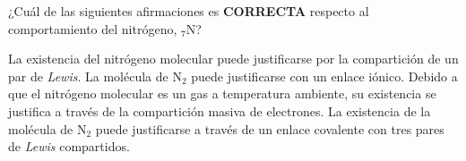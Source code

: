 \documentclass[answers,addpoints,14pt]{exam}
\newcommand*\chem[1]{\ensuremath{\mathrm{#1}}}
\newcommand{\halmos}{\vspace*{-4mm}
	
					\begin{flushright}
						\rule{1mm}{2.5mm} 
					\end{flushright}\vspace*{-4mm}
						
					  }
\renewcommand{\qed}{\halmos}
\begin{document}
\begin{questions}
	
		
%
%	
%	

	
	\begin{question}[1] ¿Cuál de las siguientes afirmaciones es \textbf{\small{CORRECTA}} respecto al comportamiento del nitrógeno, $_{7}\chem{N}$?
		\begin{checkboxes}
			\choice La existencia del nitrógeno molecular puede justificarse por la compartición de un par de \textit{Lewis}.
			\choice La molécula de $\chem{N_2}$ puede justificarse con un enlace iónico.
			\choice Debido a que el nitrógeno molecular es un gas a temperatura ambiente, su existencia se justifica a través de la compartición masiva de electrones.
			\CorrectChoice La existencia de la molécula de $\chem{N_2}$ puede justificarse a través de un enlace covalente con tres pares de \textit{Lewis} compartidos.
		\end{checkboxes}
		

\end{question}
\end{questions}
\end{document}
